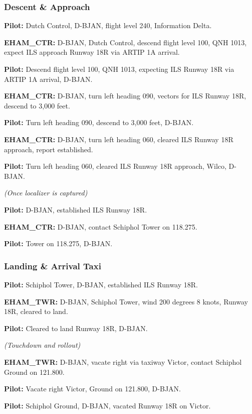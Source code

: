\documentclass{article}
\newcommand{\callsign}{D-BJAN}
\begin{document}
\subsubsection*{Descent \& Approach}

\textbf{Pilot:} Dutch Control, \callsign, flight level 240, Information Delta.

\textbf{EHAM\_CTR:} \callsign, Dutch Control, descend flight level 100, QNH 1013, expect ILS approach Runway 18R via ARTIP 1A arrival.

\textbf{Pilot:} Descend flight level 100, QNH 1013, expecting ILS Runway 18R via ARTIP 1A arrival, \callsign.

\textbf{EHAM\_CTR:} \callsign, turn left heading 090, vectors for ILS Runway 18R, descend to 3,000 feet.

\textbf{Pilot:} Turn left heading 090, descend to 3,000 feet, \callsign.

\textbf{EHAM\_CTR:} \callsign, turn left heading 060, cleared ILS Runway 18R approach, report established.

\textbf{Pilot:} Turn left heading 060, cleared ILS Runway 18R approach, Wilco, \callsign.

\textit{(Once localizer is captured)}

\textbf{Pilot:} \callsign, established ILS Runway 18R.

\textbf{EHAM\_CTR:} \callsign, contact Schiphol Tower on 118.275.

\textbf{Pilot:} Tower on 118.275, \callsign.

\subsubsection*{Landing \& Arrival Taxi}

\textbf{Pilot:} Schiphol Tower, \callsign, established ILS Runway 18R.

\textbf{EHAM\_TWR:} \callsign, Schiphol Tower, wind 200 degrees 8 knots, Runway 18R, cleared to land.

\textbf{Pilot:} Cleared to land Runway 18R, \callsign.

\textit{(Touchdown and rollout)}

\textbf{EHAM\_TWR:} \callsign, vacate right via taxiway Victor, contact Schiphol Ground on 121.800.

\textbf{Pilot:} Vacate right Victor, Ground on 121.800, \callsign.

\textbf{Pilot:} Schiphol Ground, \callsign, vacated Runway 18R on Victor.
\end{document}
